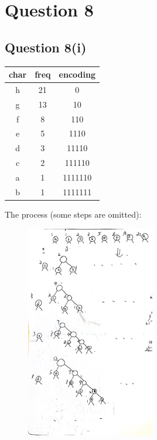 \documentclass[11pt]{article}
\begin{document}
\newpage
\section{Question 8}
\subsection{Question 8(i)}
\begin{center}
\begin{tabular}{ c c c }
 char & freq & encoding \\ 
 \hline
 h & 21 & 0 \\
 g & 13 & 10 \\  
 f & 8 & 110 \\  
 e & 5 & 1110 \\    
 d & 3 & 11110 \\   
 c & 2 & 111110 \\       
 a & 1 & 1111110 \\    
 b & 1 & 1111111 \\    
\end{tabular}
\end{center}

The process (some steps are omitted):
\begin{figure}[hbt!]
  \centering
  \includegraphics[width=0.5\textwidth]{Huffman_code_process.jpg}
\end{figure}
\end{document}
